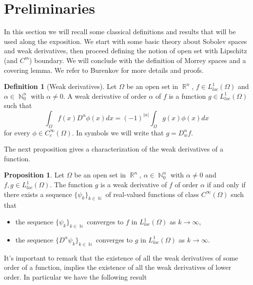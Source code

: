 \documentclass[12pt]{article}
\theoremstyle{definition}
\newtheorem{definition}{Definition}
\newtheorem{prop}{Proposition}
\DeclareMathOperator\rr{\mathbb{R}}
\DeclareMathOperator\nn{\mathbb{N}}
\begin{document}
\section{Preliminaries}
In this section we will recall some classical definitions and results that will be used along the exposition. We start with some basic theory about Sobolev spaces and weak derivatives, then proceed defining the notion of open set with Lipschitz (and $C^m$) boundary.  We will conclude with the definition of Morrey spaces and a covering lemma. We refer to Burenkov\cite{burenkov} for more details and proofs.
\begin{definition}[Weak derivatives]
	Let $\Omega$ be an open set in $\rr^n$, $f \in L^1_{loc}(\Omega)$ and  $\alpha\in \nn^n_0$ with $\alpha \neq 0.$ A weak derivative of order $\alpha$ of $f$ is a function $g \in L^1_{loc}(\Omega)$ such that
	\[\int_\Omega f(x)D^\alpha\phi(x)dx=(-1)^{|\alpha|} \int_\Omega g(x)\phi(x)dx\]
	for every $\phi \in C_c^\infty(\Omega).$ In symbols we will write that $g=D^\alpha_wf.$
\end{definition}
The next proposition gives a characterization of the weak derivatives of a function.
\begin{prop}\label{weak2}
	Let $\Omega$ be an open set in $\rr^n$, $\alpha \in \nn^n_0$ with $\alpha \neq 0$ and $f,g \in L^1_{loc}(\Omega).$ The function $g$ is a weak derivative of $f$ of order $\alpha$ if and only if there exists a sequence $\{\psi_k\}_{k\in\nn}$ of real-valued functions of class $C^\infty(\Omega)$ such that 
	\begin{itemize}
		\item the sequence $\{\psi_k\}_{k\in\nn}$ converges to $f$ in $L^1_{loc}(\Omega)$ as $k \to \infty$,
		\item the sequence $\{D^\alpha\psi_k\}_{k\in \nn}$ converges to $g$ in $L^1_{loc}(\Omega)$ as $k \to \infty$.
	\end{itemize}
\end{prop}
It's important to remark that the existence of all the weak derivatives of some order of a function, implies the existence of all the weak derivatives of lower order. In particular we have the following result
\end{document}
